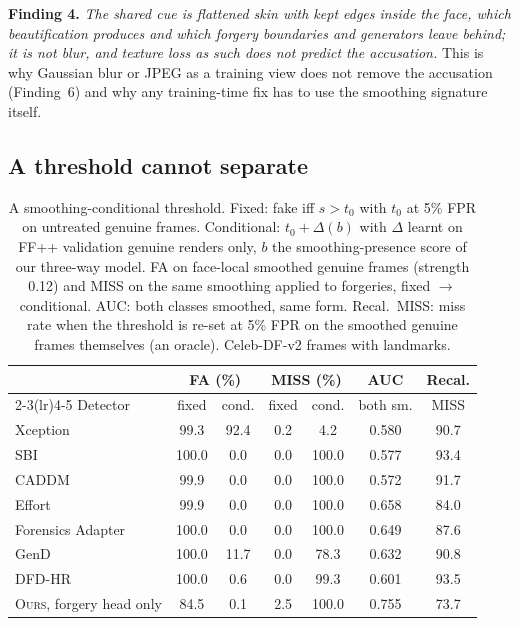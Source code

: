 \documentclass[conference]{IEEEtran}
\newcommand{\ours}{\textsc{Ours}}
\begin{document}
\textbf{Finding 4.} \emph{The shared cue is flattened skin with kept edges inside the face, which beautification produces
and which forgery boundaries and generators leave behind; it is not blur, and texture loss as such does not predict the
accusation.} This is why Gaussian blur or JPEG as a training view does not remove the accusation (Finding~6) and why any
training-time fix has to use the smoothing signature itself.

\subsection{A threshold cannot separate}
\label{sec:threshold}
\begin{table}[t]
\centering
\caption{A smoothing-conditional threshold. Fixed: fake iff $s>t_0$ with $t_0$ at 5\% FPR on untreated genuine frames.
Conditional: $t_0+\Delta(b)$ with $\Delta$ learnt on FF++ validation genuine renders only, $b$ the smoothing-presence score of
our three-way model. FA on face-local smoothed genuine frames (strength 0.12) and MISS on the same smoothing applied to
forgeries, fixed $\to$ conditional. AUC: both classes smoothed, same form. Recal.\ MISS: miss rate when the threshold is
re-set at 5\% FPR on the smoothed genuine frames themselves (an oracle). Celeb-DF-v2 frames with landmarks.}
\label{tab:bct}
\scriptsize
\setlength{\tabcolsep}{3pt}
\begin{tabular}{@{}l cc cc c c@{}}
\toprule
 & \multicolumn{2}{c}{FA (\%)} & \multicolumn{2}{c}{MISS (\%)} & AUC & Recal. \\
\cmidrule(lr){2-3}\cmidrule(lr){4-5}
Detector & fixed & cond. & fixed & cond. & both sm. & MISS \\
\midrule
Xception & 99.3 & 92.4 & 0.2 & 4.2 & 0.580 & 90.7 \\
SBI & 100.0 & 0.0 & 0.0 & 100.0 & 0.577 & 93.4 \\
CADDM & 99.9 & 0.0 & 0.0 & 100.0 & 0.572 & 91.7 \\
Effort & 99.9 & 0.0 & 0.0 & 100.0 & 0.658 & 84.0 \\
Forensics Adapter & 100.0 & 0.0 & 0.0 & 100.0 & 0.649 & 87.6 \\
GenD & 100.0 & 11.7 & 0.0 & 78.3 & 0.632 & 90.8 \\
DFD-HR & 100.0 & 0.6 & 0.0 & 99.3 & 0.601 & 93.5 \\
\ours{}, forgery head only & 84.5 & 0.1 & 2.5 & 100.0 & 0.755 & 73.7 \\
\bottomrule
\end{tabular}
\end{table}
\end{document}
